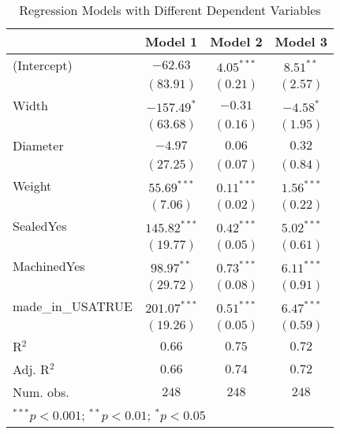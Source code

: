 
\begin{table}
\begin{center}
\begin{tabular}{l c c c}
\hline
 & Model 1 & Model 2 & Model 3 \\
\hline
(Intercept)       & $-62.63$       & $4.05^{***}$ & $8.51^{**}$  \\
                  & $(83.91)$      & $(0.21)$     & $(2.57)$     \\
Width             & $-157.49^{*}$  & $-0.31$      & $-4.58^{*}$  \\
                  & $(63.68)$      & $(0.16)$     & $(1.95)$     \\
Diameter          & $-4.97$        & $0.06$       & $0.32$       \\
                  & $(27.25)$      & $(0.07)$     & $(0.84)$     \\
Weight            & $55.69^{***}$  & $0.11^{***}$ & $1.56^{***}$ \\
                  & $(7.06)$       & $(0.02)$     & $(0.22)$     \\
SealedYes         & $145.82^{***}$ & $0.42^{***}$ & $5.02^{***}$ \\
                  & $(19.77)$      & $(0.05)$     & $(0.61)$     \\
MachinedYes       & $98.97^{**}$   & $0.73^{***}$ & $6.11^{***}$ \\
                  & $(29.72)$      & $(0.08)$     & $(0.91)$     \\
made\_in\_USATRUE & $201.07^{***}$ & $0.51^{***}$ & $6.47^{***}$ \\
                  & $(19.26)$      & $(0.05)$     & $(0.59)$     \\
\hline
R$^2$             & $0.66$         & $0.75$       & $0.72$       \\
Adj. R$^2$        & $0.66$         & $0.74$       & $0.72$       \\
Num. obs.         & $248$          & $248$        & $248$        \\
\hline
\multicolumn{4}{l}{\scriptsize{$^{***}p<0.001$; $^{**}p<0.01$; $^{*}p<0.05$}}
\end{tabular}
\caption{Regression Models with Different Dependent Variables}
\label{tab:reg_by_dep_var}
\end{center}
\end{table}
